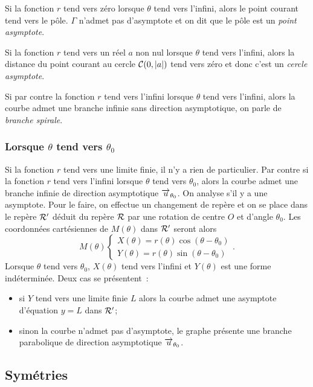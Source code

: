 Si la fonction \(r\) tend vers zéro lorsque \(\theta\) tend vers l'infini, alors 
le point courant tend vers le pôle. \(\Gamma\) n'admet pas d'asymptote et on dit 
que le pôle est un \emph{point asymptote}.

Si la fonction \(r\) tend vers un réel \(a\) non nul lorsque \(\theta\) tend 
vers l'infini, alors la distance du point courant au cercle 
\(\mathcal{C}(0,\left\lvert a\right\rvert)\) tend vers zéro et donc c'est un \emph{cercle asymptote}.

Si par contre la fonction \(r\) tend vers l'infini lorsque \(\theta\) tend vers 
l'infini, alors la courbe admet une branche infinie sans direction asymptotique, 
on parle de \emph{branche spirale}.

\subsubsection{Lorsque \(\theta\) tend vers \(\theta_0\)}

Si la fonction \(r\) tend vers une limite finie, il n'y a rien de particulier.  
Par contre si la fonction \(r\) tend vers l'infini lorsque \(\theta\) tend vers 
\(\theta_0\), alors la courbe admet une branche infinie de direction 
asymptotique \(\overrightarrow{u}_{\theta_0}\). On analyse s'il y a une asymptote. Pour le 
faire, on effectue un changement de repère et on se place dans le repère 
\(\mathcal{R}'\) déduit du repère \(\mathcal{R}\) par une rotation de centre \(O\) et d'angle 
\(\theta_0\). Les coordonnées cartésiennes de \(M(\theta)\) dans \(\mathcal{R}'\) 
seront alors
\begin{equation}
  M(\theta)
  \begin{cases}
    X(\theta)=r(\theta)\cos(\theta-\theta_0)\\
    Y(\theta)=r(\theta)\sin(\theta-\theta_0)
  \end{cases}.
\end{equation}
Lorsque \(\theta\) tend vers \(\theta_0\), \(X(\theta)\) tend vers l'infini et 
\(Y(\theta)\) est une forme indéterminée. Deux cas se présentent~:
\begin{itemize}
  \item si \(Y\) tend vers une limite finie \(L\) alors la courbe admet une 
    asymptote d'équation \(y = L\) dans \(\mathcal{R}'\);
  \item sinon la courbe n'admet pas d'asymptote, le graphe présente une branche 
    parabolique de direction asymptotique \(\overrightarrow{u}_{\theta_0}\).
\end{itemize}

\subsection{Symétries}

